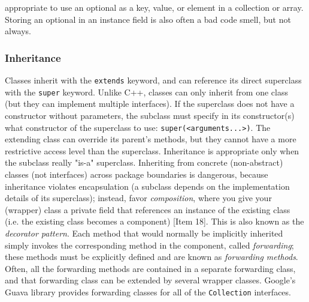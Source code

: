 \documentclass[table, xcdraw]{article}%
\begin{document}
appropriate to use an optional as a key, value, or element in a collection or array. Storing an optional in an instance field is also often a bad code smell, but not always.

\subsubsection{Inheritance}

Classes inherit with the \texttt{extends} keyword, and can reference its direct superclass with the \texttt{super} keyword. Unlike C++, classes can only inherit from one class (but they can implement multiple interfaces). If the superclass does not have a constructor without parameters, the subclass must specify in its constructor(s) what constructor of the superclass to use: \texttt{super(<arguments...>)}. The extending class can override its parent's methods, but they cannot have a more restrictive access level than the superclass. Inheritance is appropriate only when the subclass really "is-a" superclass. Inheriting from concrete (non-abstract) classes (not interfaces) across package boundaries is dangerous, because inheritance violates encapsulation (a subclass depends on the implementation details of its superclass); instead, favor \emph{composition}, where you give your (wrapper) class a private field that references an instance of the existing class (i.e. the existing class becomes a component) [Item 18]. This is also known as the \emph{decorator pattern}. Each method that would normally be implicitly inherited simply invokes the corresponding method in the component, called \emph{forwarding}; these methods must be explicitly defined and are known as \emph{forwarding methods}. Often, all the forwarding methods are contained in a separate forwarding class, and that forwarding class can be extended by several wrapper classes. Google's Guava library provides forwarding classes for all of the \texttt{Collection} interfaces.
\end{document}
